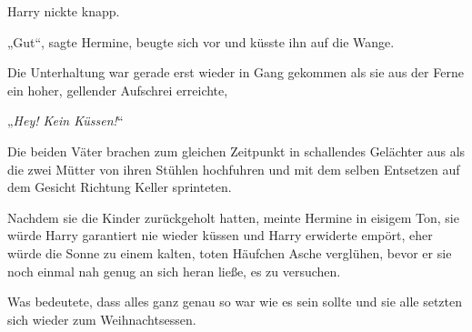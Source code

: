 Harry nickte knapp.

„Gut“, sagte Hermine, beugte sich vor und küsste ihn auf die Wange.

\later

Die Unterhaltung war gerade erst wieder in Gang gekommen als sie aus der Ferne ein hoher, gellender Aufschrei erreichte,

„\emph{Hey! Kein Küssen!}“

Die beiden Väter brachen zum gleichen Zeitpunkt in schallendes Gelächter aus als die zwei Mütter von ihren Stühlen hochfuhren und mit dem selben Entsetzen auf dem Gesicht Richtung Keller sprinteten.

Nachdem sie die Kinder zurückgeholt hatten, meinte Hermine in eisigem Ton, sie würde Harry garantiert nie wieder küssen und Harry erwiderte empört, eher würde die Sonne zu einem kalten, toten Häufchen Asche verglühen, bevor er sie noch einmal nah genug an sich heran ließe, es zu versuchen.

Was bedeutete, dass alles ganz genau so war wie es sein sollte und sie alle setzten sich wieder zum Weihnachtsessen.

